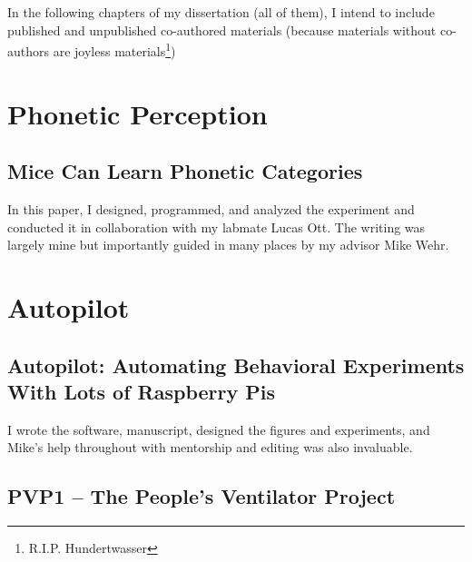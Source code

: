 
In the following chapters of my dissertation (all of them), I intend to include published and unpublished co-authored materials (because materials without co-authors are joyless materials\footnote{R.I.P. Hundertwasser})


\section{Phonetic Perception}

\subsection{Mice Can Learn Phonetic Categories}

\begin{leftbar}
\end{leftbar}

In this paper, I designed, programmed, and analyzed the experiment and conducted it in collaboration with my labmate Lucas Ott. The writing was largely mine but importantly guided in many places by my advisor Mike Wehr.

\section{Autopilot}

\subsection{Autopilot: Automating Behavioral Experiments With Lots of Raspberry Pis}

\begin{leftbar}
\end{leftbar}

I wrote the software, manuscript, designed the figures and experiments, and Mike's help throughout with mentorship and editing was also invaluable. 

\subsection{PVP1 – The People’s Ventilator Project}

\begin{leftbar}
\end{leftbar}

